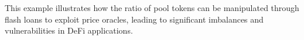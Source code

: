 This example illustrates how the ratio of pool tokens can be manipulated through flash loans to exploit price oracles, leading to significant imbalances and vulnerabilities in DeFi applications.







